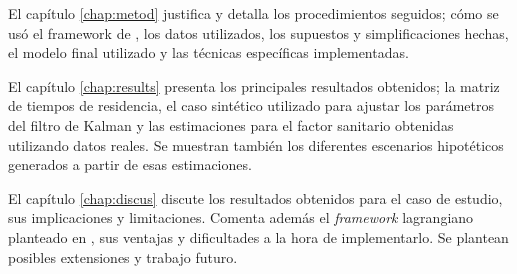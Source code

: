 \begin{intro}
El capítulo \ref{chap:metod} justifica y detalla los procedimientos seguidos; cómo se usó el framework de \cite{Bichara2018}, los datos utilizados, los supuestos y simplificaciones hechas, el modelo final utilizado y las técnicas específicas implementadas.

El capítulo \ref{chap:results} presenta los principales resultados obtenidos; la matriz de tiempos de residencia, el caso sintético utilizado para ajustar los parámetros del filtro de Kalman y las estimaciones para el factor sanitario obtenidas utilizando datos reales. Se muestran también los diferentes escenarios hipotéticos generados a partir de esas estimaciones.

El capítulo \ref{chap:discus} discute los resultados obtenidos para el caso de estudio, sus implicaciones y limitaciones. Comenta además el  \textit{framework} lagrangiano planteado en \cite{Bichara2018}, sus ventajas y dificultades a la hora de implementarlo. Se plantean posibles extensiones y trabajo futuro.



\end{intro}

%
%





